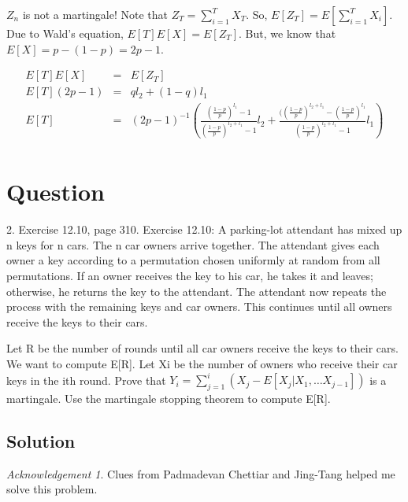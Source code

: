 \documentclass[10pt]{amsart}
\theoremstyle{remark}
\newtheorem*{ack}{Acknowledgement}
\begin{document}
$Z_{n}$ is not a martingale! Note that $Z_{T} = \sum_{i=1}^{T}X_{T}$. So, $E[Z_{T}] = E[\sum_{i=1}^{T}X_{i}]$. Due to Wald's equation, $E[T]E[X] = E[Z_{T}]$. But, we know that $E[X] = p - (1-p) = 2p-1$.

\begin{eqnarray*}
E[T]E[X] &=& E[Z_{T}]\\
E[T](2p-1) &=& ql_{2} + (1-q)l_{1}\\
E[T] &=& (2p-1)^{-1}(\frac{(\frac{1-p}{p})^{l_{1}} - 1}{(\frac{1-p}{p})^{l_{2}+l_{1}} - 1}l_{2} + \frac{((\frac{1-p}{p})^{l_{2}+l_{1}} - (\frac{1-p}{p})^{l_{1}}}{(\frac{1-p}{p})^{l_{2}+l_{1}} - 1}l_{1})\\
\end{eqnarray*} 

\section{Question}
2. Exercise 12.10, page 310. Exercise 12.10: A parking-lot attendant has mixed up n keys for n cars. The n car owners arrive together. The attendant gives each owner a key according to a permutation chosen uniformly at random from all permutations. If an owner receives the key to his car, he takes it and leaves; otherwise, he returns the key to the attendant. The attendant now repeats the process with the remaining keys and car owners. This continues until all owners receive the keys to their cars.

Let R be the number of rounds until all car owners receive the keys to their cars. We want to compute E[R]. Let Xi be the number of owners who receive their car keys in the ith round. Prove that
$Y_{i}=\sum_{j=1}^{i}(X_{j}-E[X_{j}|X_{1},\dots X_{j-1}])$ is a martingale. Use the martingale stopping theorem to compute E[R].

\subsection{Solution}
\begin{ack}
Clues from Padmadevan Chettiar and Jing-Tang helped me solve this problem.
\end{ack}
\end{document}
